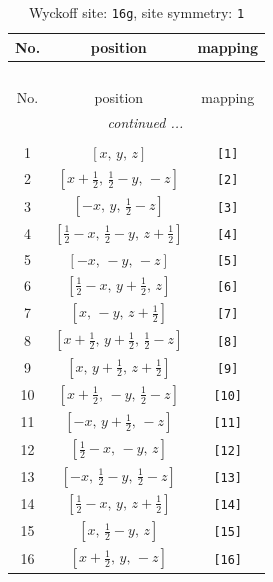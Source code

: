 \documentclass[fleqn,8pt]{jsarticle}
\begin{document}
\begin{longtable}{ccc}
\caption{Wyckoff site: {\tt 16g}, site symmetry: {\tt 1}}
 \\
 \hline \hline
No. & position & mapping \\ \hline \endfirsthead

\multicolumn{2}{l}{\tablename\ \thetable{}} \\
 \hline \hline
No. & position & mapping \\ \hline \endhead

 \hline \hline
\multicolumn{2}{r}{\footnotesize\it continued ...} \\ \endfoot

 \hline \hline
\multicolumn{2}{r}{} \\ \endlastfoot

1 & $\left[ x,\, y,\, z \right]$ & {\tt [1]} \\ \hline
2 & $\left[ x + \frac{1}{2},\, \frac{1}{2} - y,\, - z \right]$ & {\tt [2]} \\ \hline
3 & $\left[ - x,\, y,\, \frac{1}{2} - z \right]$ & {\tt [3]} \\ \hline
4 & $\left[ \frac{1}{2} - x,\, \frac{1}{2} - y,\, z + \frac{1}{2} \right]$ & {\tt [4]} \\ \hline
5 & $\left[ - x,\, - y,\, - z \right]$ & {\tt [5]} \\ \hline
6 & $\left[ \frac{1}{2} - x,\, y + \frac{1}{2},\, z \right]$ & {\tt [6]} \\ \hline
7 & $\left[ x,\, - y,\, z + \frac{1}{2} \right]$ & {\tt [7]} \\ \hline
8 & $\left[ x + \frac{1}{2},\, y + \frac{1}{2},\, \frac{1}{2} - z \right]$ & {\tt [8]} \\ \hline
9 & $\left[ x,\, y + \frac{1}{2},\, z + \frac{1}{2} \right]$ & {\tt [9]} \\ \hline
10 & $\left[ x + \frac{1}{2},\, - y,\, \frac{1}{2} - z \right]$ & {\tt [10]} \\ \hline
11 & $\left[ - x,\, y + \frac{1}{2},\, - z \right]$ & {\tt [11]} \\ \hline
12 & $\left[ \frac{1}{2} - x,\, - y,\, z \right]$ & {\tt [12]} \\ \hline
13 & $\left[ - x,\, \frac{1}{2} - y,\, \frac{1}{2} - z \right]$ & {\tt [13]} \\ \hline
14 & $\left[ \frac{1}{2} - x,\, y,\, z + \frac{1}{2} \right]$ & {\tt [14]} \\ \hline
15 & $\left[ x,\, \frac{1}{2} - y,\, z \right]$ & {\tt [15]} \\ \hline
16 & $\left[ x + \frac{1}{2},\, y,\, - z \right]$ & {\tt [16]} \\
\end{longtable}
\end{document}
